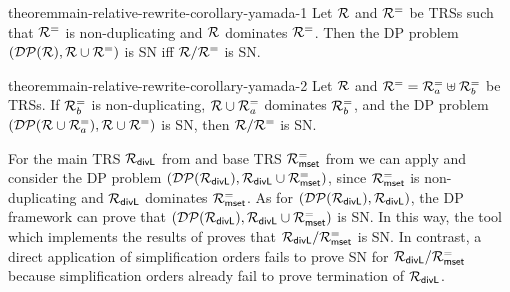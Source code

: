 \begin{restatable}{theorem}{main-relative-rewrite-corollary-yamada-1}\label{theorem:main-relative-rewrite-corollary-yamada-1}
    Let $\mathcal{R}$ and $\mathcal{R}^{=}$ be TRSs such that $\mathcal{R}^{=}$ is non-duplicating and \pagebreak[2] $\mathcal{R}$ dominates $\mathcal{R}^{=}$.
    Then the DP problem
      $(\mathcal{DP}(\mathcal{R}), \mathcal{R} \cup \mathcal{R}^{=})$ is SN iff $\mathcal{R} / \mathcal{R}^{=}$ is SN.
\end{restatable}

\begin{restatable}{theorem}{main-relative-rewrite-corollary-yamada-2}\label{theorem:main-relative-rewrite-corollary-yamada-2}
    Let $\mathcal{R}$ and $\mathcal{R}^{=} = \mathcal{R}^{=}_a \uplus \mathcal{R}^{=}_b$ be TRSs.
	If $\mathcal{R}^{=}_b$ is non-duplicating, $\mathcal{R} \cup \mathcal{R}^{=}_a$ dominates $\mathcal{R}^{=}_b$,
    and the DP problem $(\mathcal{DP}(\mathcal{R} \cup \mathcal{R}^{=}_a), \mathcal{R} \cup \mathcal{R}^{=})$ is SN, 
    then $\mathcal{R} / \mathcal{R}^{=}$ is SN.
\end{restatable}

\begin{example}
  For the main TRS $\mathcal{R}_{\mathsf{divL}}$ from  and base TRS $\mathcal{R}^{=}_{\mathsf{mset}}$ from \linebreak
  we can apply
     and consider the DP problem
    $(\mathcal{DP}(\mathcal{R}_{\mathsf{divL}}), \mathcal{R}_{\mathsf{divL}} \cup \mathcal{R}^{=}_{\mathsf{mset}})$, since $\mathcal{R}^{=}_{\mathsf{mset}}$ is
    non-duplicating and $\mathcal{R}_{\mathsf{divL}}$ dominates $\mathcal{R}^{=}_{\mathsf{mset}}$.
    As for $(\mathcal{DP}(\mathcal{R}_{\mathsf{divL}}), \mathcal{R}_{\mathsf{divL}})$, the DP
    framework can prove that $(\mathcal{DP}(\mathcal{R}_{\mathsf{divL}}), \mathcal{R}_{\mathsf{divL}} \cup
    \mathcal{R}^{=}_{\mathsf{mset}})$ is SN. In this way, the tool \natt{} 
    which implements the results of
    \cite{iborra2017relative}  proves that $\mathcal{R}_{\mathsf{divL}} / \mathcal{R}^{=}_{\mathsf{mset}}$ is SN.
In contrast,  a direct application of  simplification orders fails to prove
    SN for $\mathcal{R}_{\mathsf{divL}} / \mathcal{R}^{=}_{\mathsf{mset}}$ because simplification orders already fail to
    prove termination of $\mathcal{R}_{\mathsf{divL}}$.
\end{example}

